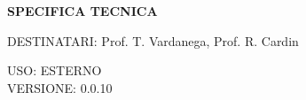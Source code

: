 \documentclass[5pt]{article}
\begin{document}
	\vspace{24pt}
	
	\begin{center}
		\textbf{\LARGE SPECIFICA TECNICA}
	\end{center}
	
	\vspace{13pt}
	
	\begin{flushleft}
		\begin{spacing}{1.5}
			DESTINATARI: Prof. T. Vardanega, Prof. R. Cardin\\%
		\end{spacing}
	\end{flushleft}
	
	\begin{flushright}
		\begin{spacing}{1}
			USO: ESTERNO\\
			VERSIONE: 0.0.10\\
		\end{spacing}
	\end{flushright}
	
	
	\restoregeometry
	
	\pagebreak
	
\end{document}
